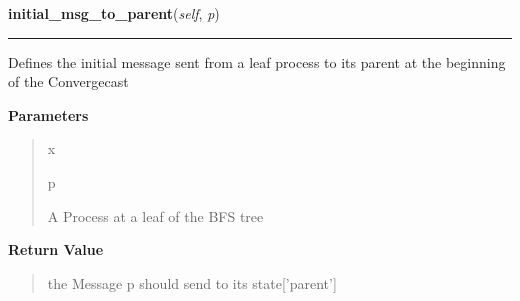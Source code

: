     \label{datk:core:algs:AsynchConvergecast:initial_msg_to_parent}

    \vspace{0.5ex}

\hspace{.8\funcindent}\begin{boxedminipage}{\funcwidth}

    \raggedright \textbf{initial\_msg\_to\_parent}(\textit{self}, \textit{p})

    \vspace{-1.5ex}

    \rule{\textwidth}{0.5\fboxrule}
\setlength{\parskip}{2ex}
    Defines the initial message sent from a leaf process to its parent at 
    the beginning of the Convergecast

\setlength{\parskip}{1ex}
      \textbf{Parameters}
      \vspace{-1ex}

      \begin{quote}
        \begin{Ventry}{x}

          \item[p]

          A Process at a leaf of the BFS tree

        \end{Ventry}

      \end{quote}

      \textbf{Return Value}
    \vspace{-1ex}

      \begin{quote}
      the Message p should send to its state['parent']

      \end{quote}

    \end{boxedminipage}

    \label{datk:core:algs:AsynchConvergecast:trans_msg_to_parent}

    \vspace{0.5ex}


